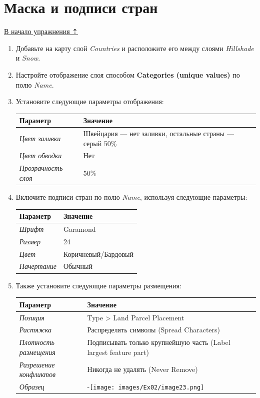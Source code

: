 \documentclass[12pt,]{book}
\begin{document}
\hypertarget{map-design-general-mask}{%
\section{Маска и подписи стран}\label{map-design-general-mask}}

\protect\hyperlink{map-design-general}{В начало упражнения ⇡}

\begin{enumerate}
\def\labelenumi{\arabic{enumi}.}
\item
  Добавьте на карту слой \emph{Countries} и расположите его между слоями \emph{Hillshade} и \emph{Snow}.
\item
  Настройте отображение слоя способом \textbf{Categories (unique values)} по полю \emph{Name}.
\item
  Установите следующие параметры отображения:

  \begin{longtable}[]{@{}ll@{}}
  \toprule
  Параметр & Значение\tabularnewline
  \midrule
  \endhead
  \emph{Цвет заливки} & Швейцария --- нет заливки, остальные страны --- серый 50\%\tabularnewline
  \emph{Цвет обводки} & Нет\tabularnewline
  \emph{Прозрачность слоя} & 50\%\tabularnewline
  \bottomrule
  \end{longtable}
\item
  Включите подписи стран по полю \emph{Name}, используя следующие параметры:

  \begin{longtable}[]{@{}ll@{}}
  \toprule
  Параметр & Значение\tabularnewline
  \midrule
  \endhead
  \emph{Шрифт} & Garamond\tabularnewline
  \emph{Размер} & 24\tabularnewline
  \emph{Цвет} & Коричневый/Бардовый\tabularnewline
  \emph{Начертание} & Обычный\tabularnewline
  \bottomrule
  \end{longtable}
\item
  Также установите следующие параметры размещения:

  \begin{longtable}[]{@{}ll@{}}
  \toprule
  Параметр & Значение\tabularnewline
  \midrule
  \endhead
  \emph{Позиция} & Type \textgreater{} Land Parcel Placement\tabularnewline
  \emph{Растяжка} & Распределять символы (Spread Characters)\tabularnewline
  \emph{Плотность размещения} & Подписывать только крупнейшую часть (Label largest feature part)\tabularnewline
  \emph{Разрешение конфликтов} & Никогда не удалять (Never Remove)\tabularnewline
  \emph{Образец} & -\texttt{[image: images/Ex02/image23.png]}\tabularnewline
  \bottomrule
  \end{longtable}
\end{enumerate}
\end{document}
